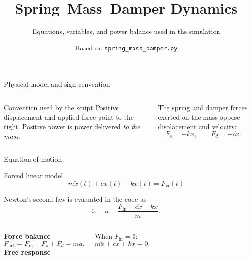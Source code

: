 \documentclass[aspectratio=169,10pt]{beamer}
\title{Spring--Mass--Damper Dynamics}
\subtitle{Equations, variables, and power balance used in the simulation}
\author{Based on \texttt{spring\_mass\_damper.py}}
\date{}
\begin{document}
\maketitle

\begin{frame}{Physical model and sign convention}
\begin{columns}[c]
\begin{block}{Convention used by the script}
Positive displacement and applied force point to the right. Positive power is power delivered \emph{to the mass}.
\end{block}
\vspace{0.4em}
The spring and damper forces exerted on the mass oppose displacement and velocity:
\[
F_s=-kx, \qquad F_d=-c\dot{x}.
\]
\end{columns}
\end{frame}

\begin{frame}{Equation of motion}
\begin{block}{Forced linear model}
\[
\boxed{m\ddot{x}(t)+c\dot{x}(t)+kx(t)=F_{\mathrm{in}}(t)}
\]
\end{block}
\vspace{0.5em}
Newton's second law is evaluated in the code as
\[
\ddot{x}=a=\frac{F_{\mathrm{in}}-c\dot{x}-kx}{m}.
\]
\begin{columns}[T]
\textbf{Force balance}
\[
F_{\mathrm{net}}=F_{\mathrm{in}}+F_s+F_d=ma.
\]
\textbf{Free response}\par
When $F_{\mathrm{in}}=0$:
\[
m\ddot{x}+c\dot{x}+kx=0.
\]
\end{columns}
\end{frame}
\end{document}
